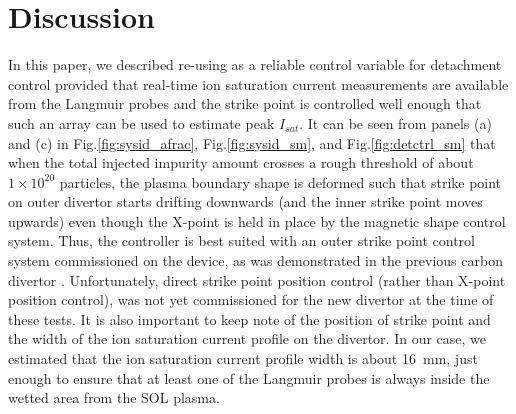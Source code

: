 \section{Discussion}
\label{sec:discussion}

In this paper, we described re-using \Afrac{} as a reliable control variable for detachment control provided that real-time ion saturation current measurements are available from the Langmuir probes and the strike point is controlled well enough that such an array can be used to estimate peak $I_{sat}$.
It can be seen from panels (a) and (c) in Fig.\ref{fig:sysid_afrac}, Fig.\ref{fig:sysid_sm}, and Fig.\ref{fig:detctrl_sm} that when the total injected impurity amount crosses a rough threshold of about $1\times10^{20}$ particles, the plasma boundary shape is deformed such that strike point on outer divertor starts drifting downwards (and the inner strike point moves upwards) even though the X-point is held in place by the magnetic shape control system.
Thus, the \Afrac{} controller is best suited with an outer strike point control system commissioned on the device, as was demonstrated in the previous carbon divertor \cite{Eldon_2022_PPCF}.
Unfortunately, direct strike point position control (rather than X-point position control), was not yet commissioned for the new divertor at the time of these tests.
It is also important to keep note of the position of strike point and the width of the ion saturation current profile on the divertor.
In our case, we estimated that the ion saturation current profile width is about 16~mm, just enough to ensure that at least one of the Langmuir probes is always inside the wetted area from the \ac{SOL} plasma.
